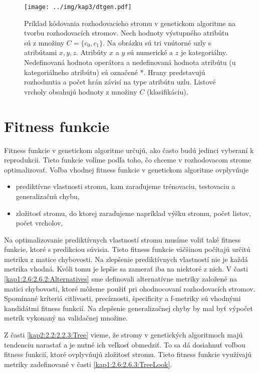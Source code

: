 \begin{figure}[h]
\centering
\centerline{\mbox{\texttt{[image: ../img/kap3/dtgen.pdf]}}}
\caption{Príklad kódovania rozhodovacieho stromu v genetickom algoritme na tvorbu rozhodovacích stromov. Nech hodnoty výstupného atribútu sú z množiny $C=\{c_0,c_1\}$. Na obrázku sú tri vnútorné uzly s atribútami $x,y,z$. Atribúty $x$ a $y$ sú numerické a $z$ je kategoriálny. Nedefinovaná hodnota operátora a nedefinovaná hodnota atribútu (u kategoriálneho atribútu) sú označené *. Hrany predstavujú rozhodnutia a počet hrán závisí na type atribútu uzlu. Listové vrcholy obsahujú hodnoty z množiny $C$ (klasifikáciu).}\label{fig:DTEncode}
\end{figure}

\section{Fitness funkcie}\label{kap3:3.3:Fitness}
Fitness funkcie v genetickom algoritme určujú, ako často budú jedinci vyberaní k reprodukcii. Tieto funkcie volíme podľa toho, čo chceme v rozhodovacom strome optimalizovať. Voľba vhodnej fitness funkcie v genetickom algoritme ovplyvňuje
\begin{itemize}
\item prediktívne vlastnosti stromu, kam zaraďujeme trénovaciu, testovaciu a generalizačnú chybu, 
\item zložitosť stromu, do ktorej zaraďujeme napríklad výšku stromu, počet listov, počet vrcholov,
\end{itemize} 

Na optimalizovanie prediktívnych vlastností stromu musíme voliť také fitness funkcie, ktoré s predikciou súvisia. Tieto fitness funkcie väčšinou počítajú určitú metriku z matice chybovosti. Na zlepšenie prediktívnych vlastností nie je každá metrika vhodná. Kvôli tomu je lepšie sa zamerať iba na niektoré z nich.
V časti \ref{kap1:2.6:2.6.2:Alternatives} sme definovali alternatívne metriky založené na matici chybovosti, ktoré môžeme použiť pri ohodnocovaní rozhodovacích stromov. Spomínané kríteriá citlivosti, precíznosti, špecificity a f-metriky sú vhodnými kandidátmi fitness funkcií. Na zlepšenie generalizačnej chyby by mal byť výpočet metrík vykonaný na validačnej množine.

Z časti \ref{kap2:2.2:2.2.3:Tree} vieme, že stromy v genetických algoritmoch majú tendenciu narastať a je nutné ich veľkosť obmedziť. To sa dá dosiahnuť voľbou fitness funkcií, ktoré ovplyvňujú zložitosť stromu. Tieto fitness funkcie využívajú metriky zadefinované v časti \ref{kap1:2.6:2.6.3:TreeLook}.

